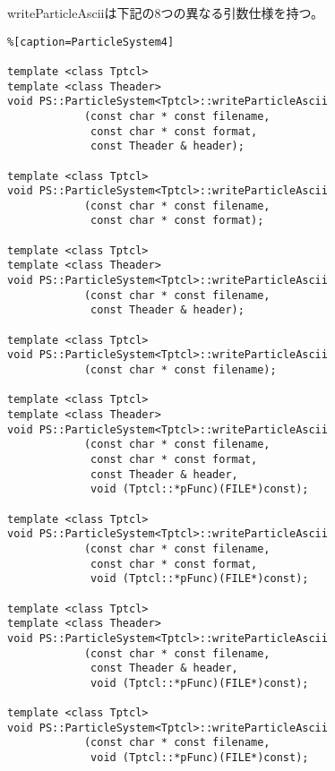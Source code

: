 writeParticleAsciiは下記の8つの異なる引数仕様を持つ。
\begin{lstlisting}%[caption=ParticleSystem4]

template <class Tptcl>
template <class Theader>
void PS::ParticleSystem<Tptcl>::writeParticleAscii
            (const char * const filename,
             const char * const format,
             const Theader & header);
             
template <class Tptcl>
void PS::ParticleSystem<Tptcl>::writeParticleAscii
            (const char * const filename,
             const char * const format);

template <class Tptcl>
template <class Theader>
void PS::ParticleSystem<Tptcl>::writeParticleAscii
            (const char * const filename,
             const Theader & header);

template <class Tptcl>
void PS::ParticleSystem<Tptcl>::writeParticleAscii
            (const char * const filename);

template <class Tptcl>
template <class Theader>
void PS::ParticleSystem<Tptcl>::writeParticleAscii
            (const char * const filename,
             const char * const format,
             const Theader & header,
             void (Tptcl::*pFunc)(FILE*)const);

template <class Tptcl>
void PS::ParticleSystem<Tptcl>::writeParticleAscii
            (const char * const filename,
             const char * const format,
             void (Tptcl::*pFunc)(FILE*)const);

template <class Tptcl>             
template <class Theader>
void PS::ParticleSystem<Tptcl>::writeParticleAscii
            (const char * const filename,
             const Theader & header,
             void (Tptcl::*pFunc)(FILE*)const);
             
template <class Tptcl>                        
void PS::ParticleSystem<Tptcl>::writeParticleAscii
            (const char * const filename,
             void (Tptcl::*pFunc)(FILE*)const);
\end{lstlisting}

